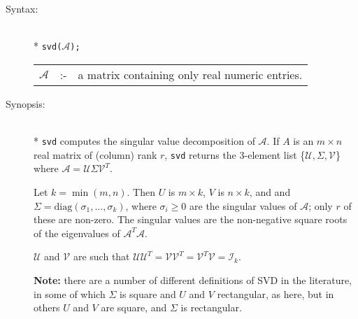 \begin{description}
\item[Syntax:]\mbox{}\\*
\texttt{svd($\mathcal{A}$);}\\[2mm]
\begin{tabular}{l l l}
$\mathcal{A}$ &:-& a matrix containing only real numeric entries.
\end{tabular}

\item[Synopsis:]\mbox{}\\*
\texttt{svd} computes the singular value decomposition of $\mathcal{A}$.
If $A$
is an $m\times n$ real matrix of (column) rank $r$, \texttt{svd} returns the
3-element list \{$\mathcal{U},\Sigma,\mathcal{V}$\} where $\mathcal{A} =
\mathcal{U} \Sigma \mathcal{V}^T$.

Let $k=\min(m,n)$.  Then $U$ is $m\times k$,
$V$ is $n\times k$, and and $\Sigma = \mbox{diag}(\sigma_{1}, \ldots ,\sigma_{k})$,
where $\sigma_{i}\ge 0$ are the singular values of $\mathcal{A}$; only $r$ of
these are non-zero.  The singular values are the non-negative square roots of
the eigenvalues of $\mathcal{A}^T \mathcal{A}$.

$\mathcal{U}$ and $\mathcal{V}$ are such that $\mathcal{UU}^T = \mathcal{VV}^T =
\mathcal{V}^T \mathcal{V} = \mathcal{I}_k$.

\textbf{Note:} there are a number of different definitions of SVD in the
literature, in some of which $\Sigma$ is square and $U$ and $V$ rectangular, as
here, but in others $U$ and $V$ are square, and $\Sigma$ is rectangular.


\end{description}
